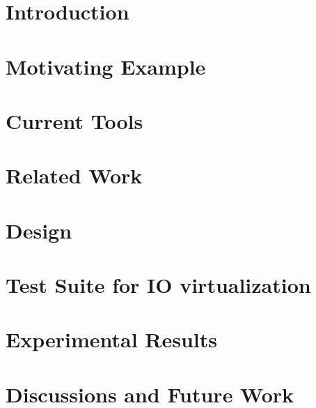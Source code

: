 \documentclass[12pt,onecolumn,oneside]{article}
\begin{document}
\onecolumn

\setcounter{page}{1}
\section{Introduction}

\newpage

\section{Motivating Example}

\newpage

\section{Current Tools}

\newpage

\section{Related Work}

\newpage

\section{Design}

\newpage

\section{Test Suite for IO virtualization}

\newpage

\section{Experimental Results}

\newpage

\section{Discussions and Future Work}

\newpage


\end{document}

